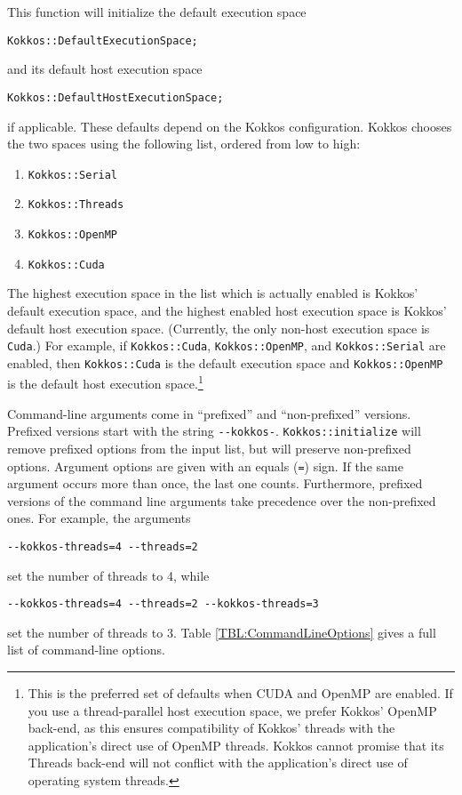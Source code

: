 This function will initialize the default execution space
\begin{lstlisting}
Kokkos::DefaultExecutionSpace;
\end{lstlisting}
and its default host execution space
\begin{lstlisting}
Kokkos::DefaultHostExecutionSpace;
\end{lstlisting}
if applicable.
These defaults depend on the Kokkos configuration.
Kokkos chooses the two spaces using the following list, ordered from low to high:
\begin{enumerate}
\item \lstinline|Kokkos::Serial| 
\item \lstinline|Kokkos::Threads|
\item \lstinline|Kokkos::OpenMP|
\item \lstinline|Kokkos::Cuda| 
\end{enumerate}
The highest execution space in the list which is actually enabled is Kokkos' default execution space,
and the highest enabled host execution space is Kokkos' default host execution space.
(Currently, the only non-host execution space is \lstinline!Cuda!.)
For example, if  \lstinline|Kokkos::Cuda|, \lstinline|Kokkos::OpenMP|, and 
\lstinline|Kokkos::Serial| are enabled, then \lstinline|Kokkos::Cuda| is the
default execution space and \lstinline|Kokkos::OpenMP| is the default host execution 
space.\footnote{This is the preferred set of defaults when CUDA and OpenMP are enabled.
If you use a thread-parallel host execution space, we prefer Kokkos' OpenMP back-end, 
as this ensures compatibility of Kokkos' threads with the application's direct use of OpenMP threads.
Kokkos cannot promise that its Threads back-end will not conflict with the application's direct use of operating system threads.}

Command-line arguments come in ``prefixed'' and ``non-prefixed'' versions.
Prefixed versions start with the string \verb!--kokkos-!.
\lstinline!Kokkos::initialize! will remove prefixed options from the input list,
but will preserve non-prefixed options.
Argument options are given with an equals (\verb!=!) sign.
If the same argument occurs more than once, the last one counts. 
Furthermore, prefixed versions of the command line arguments take precedence over the non-prefixed ones.
For example, the arguments
\begin{verbatim}
--kokkos-threads=4 --threads=2
\end{verbatim}
set the number of threads to 4, while
\begin{verbatim}
--kokkos-threads=4 --threads=2 --kokkos-threads=3
\end{verbatim}
set the number of threads to 3.
Table \ref{TBL:CommandLineOptions} gives a full list of command-line options.

